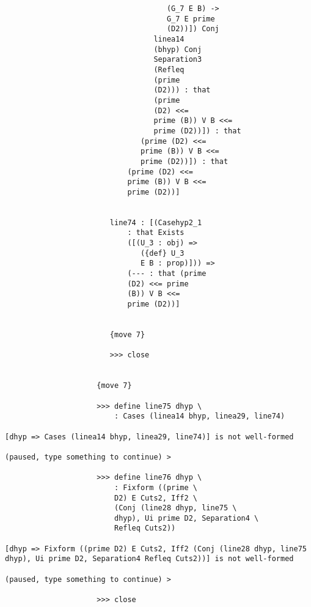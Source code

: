 \documentclass[12pt]{article}
\begin{document}
\begin{verbatim}
                                     (G_7 E B) -> 
                                     G_7 E prime 
                                     (D2))]) Conj 
                                  linea14 
                                  (bhyp) Conj 
                                  Separation3 
                                  (Refleq 
                                  (prime 
                                  (D2))) : that 
                                  (prime 
                                  (D2) <<= 
                                  prime (B)) V B <<= 
                                  prime (D2))]) : that 
                               (prime (D2) <<= 
                               prime (B)) V B <<= 
                               prime (D2))]) : that 
                            (prime (D2) <<= 
                            prime (B)) V B <<= 
                            prime (D2))]


                        line74 : [(Casehyp2_1 
                            : that Exists 
                            ([(U_3 : obj) => 
                               ({def} U_3 
                               E B : prop)])) => 
                            (--- : that (prime 
                            (D2) <<= prime 
                            (B)) V B <<= 
                            prime (D2))]


                        {move 7}

                        >>> close


                     {move 7}

                     >>> define line75 dhyp \
                         : Cases (linea14 bhyp, linea29, line74)

[dhyp => Cases (linea14 bhyp, linea29, line74)] is not well-formed

(paused, type something to continue) >

                     >>> define line76 dhyp \
                         : Fixform ((prime \
                         D2) E Cuts2, Iff2 \
                         (Conj (line28 dhyp, line75 \
                         dhyp), Ui prime D2, Separation4 \
                         Refleq Cuts2))

[dhyp => Fixform ((prime D2) E Cuts2, Iff2 (Conj (line28 dhyp, line75 dhyp), Ui prime D2, Separation4 Refleq Cuts2))] is not well-formed

(paused, type something to continue) >

                     >>> close



\end{verbatim}
\end{document}
